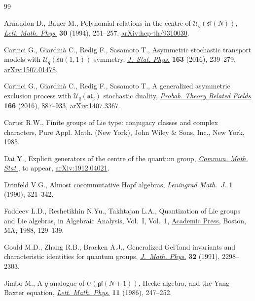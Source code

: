 \documentclass[pdftex]{sigma}
\numberwithin{equation}{section}
\begin{document}
\begin{thebibliography}{99}
\footnotesize\itemsep=0pt

Arnaudon D., Bauer M., Polynomial relations in the centre of
 {$\mathcal{U}_q(\mathfrak{sl}(N))$}, \href{https://doi.org/10.1007/BF00805857}{\textit{Lett. Math. Phys.}} \textbf{30}
 (1994), 251--257, \href{https://arxiv.org/abs/hep-th/9310030}{arXiv:hep-th/9310030}.

Carinci G., Giardin\`a C., Redig F., Sasamoto T., Asymmetric stochastic
 transport models with {$\mathcal{U}_q(\mathfrak{su}(1,1))$} symmetry,
 \href{https://doi.org/10.1007/s10955-016-1473-4}{\textit{J.~Stat. Phys.}} \textbf{163} (2016), 239--279, \href{https://arxiv.org/abs/1507.01478}{arXiv:1507.01478}.

Carinci G., Giardin\`a C., Redig F., Sasamoto T., A generalized asymmetric
 exclusion process with {$\mathcal{U}_q(\mathfrak{sl}_2)$} stochastic duality,
 \href{https://doi.org/10.1007/s00440-015-0674-0}{\textit{Probab. Theory Related Fields}} \textbf{166} (2016), 887--933,
 \href{https://arxiv.org/abs/1407.3367}{arXiv:1407.3367}.

Carter R.W., Finite groups of {L}ie type: conjugacy classes and complex
 characters, Pure Appl. Math. (New York), John Wiley \& Sons, Inc., New York,
 1985.

Dai Y., Explicit generators of the centre of the quantum group, \href{https://doi.org/10.1007/s40304-021-00263-6}{\textit{Commun.
 Math. Stat.}}, {t}o appear, \href{https://arxiv.org/abs/1912.04021}{arXiv:1912.04021}.

Drinfeld V.G., Almost cocommutative {H}opf algebras, \textit{Leningrad
 Math.~J.} \textbf{1} (1990), 321--342.

Faddeev L.D., Reshetikhin N.Yu., Takhtajan L.A., Quantization of {L}ie groups
 and {L}ie algebras, in Algebraic Analysis, {V}ol.~{I}, Vol.~1, \href{https://doi.org/10.1016/B978-0-12-400465-8.50019-5}{Academic
 Press}, Boston, MA, 1988, 129--139.

Gould M.D., Zhang R.B., Bracken A.J., Generalized {G}el'fand invariants and
 characteristic identities for quantum groups, \href{https://doi.org/10.1063/1.529152}{\textit{J.~Math. Phys.}}
 \textbf{32} (1991), 2298--2303.

Jimbo M., A {$q$}-analogue of {$U(\mathfrak{gl}(N+1))$}, {H}ecke algebra, and
 the {Y}ang--{B}axter equation, \href{https://doi.org/10.1007/BF00400222}{\textit{Lett. Math. Phys.}} \textbf{11} (1986),
 247--252.


\end{thebibliography}
\end{document}
